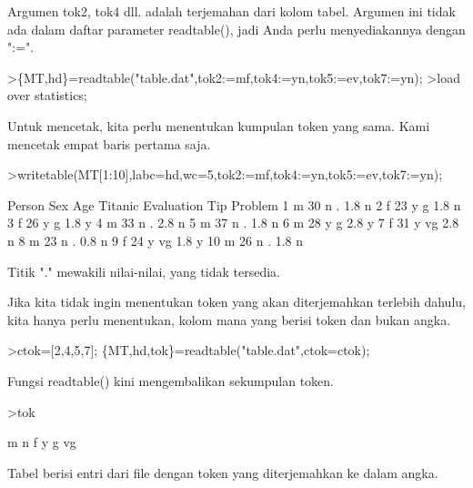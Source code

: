 \documentclass[a4paper,10pt]{article}
\begin{document}
\begin{eulernotebook}
\begin{eulercomment}
\begin{eulercomment}
\begin{eulercomment}
Argumen tok2, tok4 dll. adalah terjemahan dari kolom tabel. Argumen
ini tidak ada dalam daftar parameter readtable(), jadi Anda perlu
menyediakannya dengan ":=".
\end{eulercomment}
\begin{eulerprompt}
>\{MT,hd\}=readtable("table.dat",tok2:=mf,tok4:=yn,tok5:=ev,tok7:=yn);
>load over statistics;
\end{eulerprompt}
\begin{eulercomment}
Untuk mencetak, kita perlu menentukan kumpulan token yang sama. Kami
mencetak empat baris pertama saja.
\end{eulercomment}
\begin{eulerprompt}
>writetable(MT[1:10],labc=hd,wc=5,tok2:=mf,tok4:=yn,tok5:=ev,tok7:=yn);
\end{eulerprompt}
\begin{euleroutput}
   Person  Sex  Age Titanic Evaluation  Tip Problem
        1    m   30       n          .  1.8       n
        2    f   23       y          g  1.8       n
        3    f   26       y          g  1.8       y
        4    m   33       n          .  2.8       n
        5    m   37       n          .  1.8       n
        6    m   28       y          g  2.8       y
        7    f   31       y         vg  2.8       n
        8    m   23       n          .  0.8       n
        9    f   24       y         vg  1.8       y
       10    m   26       n          .  1.8       n
\end{euleroutput}
\begin{eulercomment}
Titik "." mewakili nilai-nilai, yang tidak tersedia.

Jika kita tidak ingin menentukan token yang akan diterjemahkan
terlebih dahulu, kita hanya perlu menentukan, kolom mana yang berisi
token dan bukan angka.
\end{eulercomment}
\begin{eulerprompt}
>ctok=[2,4,5,7]; \{MT,hd,tok\}=readtable("table.dat",ctok=ctok);
\end{eulerprompt}
\begin{eulercomment}
Fungsi readtable() kini mengembalikan sekumpulan token.
\end{eulercomment}
\begin{eulerprompt}
>tok
\end{eulerprompt}
\begin{euleroutput}
  m
  n
  f
  y
  g
  vg
\end{euleroutput}
\begin{eulercomment}
Tabel berisi entri dari file dengan token yang diterjemahkan ke dalam
angka.


\end{eulercomment}
\end{eulercomment}
\end{eulercomment}
\end{eulernotebook}
\end{document}
